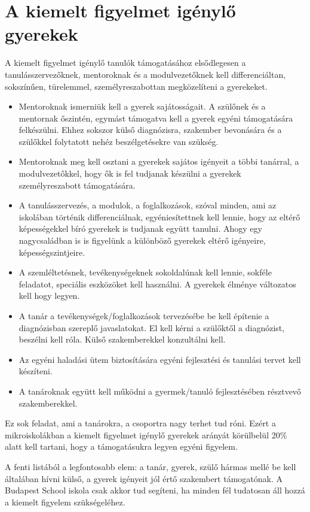 \section{A kiemelt figyelmet igénylő gyerekek}\label{sec:kiemelt_figyelem}

A kiemelt figyelmet igénylő tanulók támogatásához  elsődlegesen a tanulásszervezőknek, mentoroknak és a modulvezetőknek kell differenciáltan, sokszínűen, türelemmel, személyreszabottan megközelíteni a gyerekeket.

\begin{itemize}
      \item Mentoroknak ismerniük kell a gyerek sajátosságait. A szülőnek és a mentornak őszintén, egymást támogatva kell a gyerek egyéni támogatására felkészülni. Ehhez sokszor külső diagnózisra, szakember bevonására és a szülőkkel folytatott nehéz beszélgetésekre van szükség.
      \item Mentoroknak meg kell osztani a gyerekek sajátos igényeit a többi tanárral, a modulvezetőkkel, hogy ők is fel tudjanak készülni a gyerekek személyreszabott támogatására.
      \item
            A tanulásszervezés, a modulok, a foglalkozások, szóval minden, ami az iskolában történik  differenciálnak, egyéniesítettnek kell lennie, hogy az eltérő képességekkel bíró gyerekek is tudjanak együtt tanulni. Ahogy egy nagycsaládban is is figyelünk a különböző gyerekek eltérő igényeire, képességszintjeire.
      \item
            A szemléltetésnek, tevékenységeknek sokoldalúnak kell lennie, sokféle feladatot, speciális eszközöket kell használni. A gyerekek élménye változatos kell hogy legyen.
      \item
            A tanár a tevékenységek/foglalkozások tervezésébe  be kell építenie a diagnózisban szereplő javaslatokat. El kell kérni a szülőktől a diagnózist, beszélni kell róla. Külső szakemberekkel konzultálni kell.
      \item
            Az egyéni haladási ütem biztosítására egyéni fejlesztési és tanulási tervet kell készíteni.
      \item
            A tanároknak együtt kell működni a gyermek/tanuló fejlesztésében résztvevő szakemberekkel.
\end{itemize}

Ez sok feladat, ami a tanárokra, a csoportra nagy terhet tud róni. Ezért a mikroiskolákban a kiemelt figyelmet igénylő gyerekek arányát körülbelül 20\% alatt kell tartani, hogy a támogatásukra legyen egyéni figyelem.

A fenti listából a legfontosabb elem: a tanár, gyerek, szülő hármas mellé be kell általában hívni külső, a gyerek igényeit jól értő szakembert támogatónak. A Budapest School iskola csak akkor tud segíteni, ha minden fél tudatosan áll hozzá a kiemelt figyelem szükségeléhez.